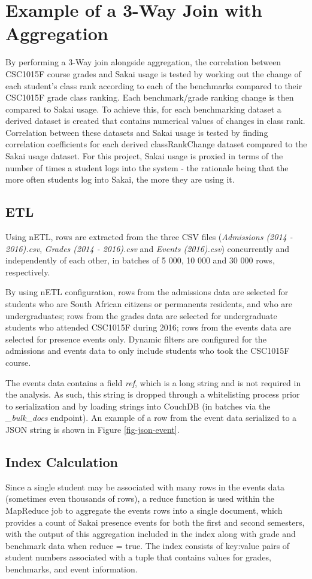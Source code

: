 \section{Example of a 3-Way Join with Aggregation}
By performing a 3-Way join alongside aggregation, the correlation between CSC1015F course grades and Sakai usage is tested by working out the change of each student's class rank according to each of the benchmarks compared to their CSC1015F grade class ranking. Each benchmark/grade ranking change is then compared to Sakai usage. To achieve this, for each benchmarking dataset a derived dataset is created that contains numerical values of changes in class rank. Correlation between these datasets and Sakai usage is tested by finding correlation coefficients for each derived classRankChange dataset compared to the Sakai usage dataset. For this project, Sakai usage is proxied in terms of the number of times a student logs into the system - the rationale being that the more often students log into Sakai, the more they are using it.

\subsection{ETL}
Using nETL, rows are extracted from the three CSV files (\textit{Admissions (2014 - 2016).csv}, \textit{Grades (2014 - 2016).csv} and \textit{Events (2016).csv}) concurrently and independently of each other, in batches of 5 000, 10 000 and 30 000 rows, respectively.

By using nETL configuration, rows from the admissions data are selected for students who are South African citizens or permanents residents, and who are undergraduates; rows from the grades data are selected for undergraduate students who attended CSC1015F during 2016; rows from the events data are selected for presence events only. Dynamic filters are configured for the admissions and events data to only include students who took the CSC1015F course.

The events data contains a field \textit{ref}, which is a long string and is not required in the analysis. As such, this string is dropped through a whitelisting process prior to serialization and by loading strings into CouchDB (in batches via the \textit{\_bulk\_docs} endpoint). An example of a row from the event data serialized to a JSON string is shown in Figure \ref{fig-json-event}.



\subsection{Index Calculation}
Since a single student may be associated with many rows in the events data (sometimes even thousands of rows), a reduce function is used within the MapReduce job to aggregate the events rows into a single document, which provides a count of Sakai presence events for both the first and second semesters, with the output of this aggregation included in the index along with grade and benchmark data when reduce = true. The index consists of key:value pairs of student numbers associated with a tuple that contains values for grades, benchmarks, and event information.

